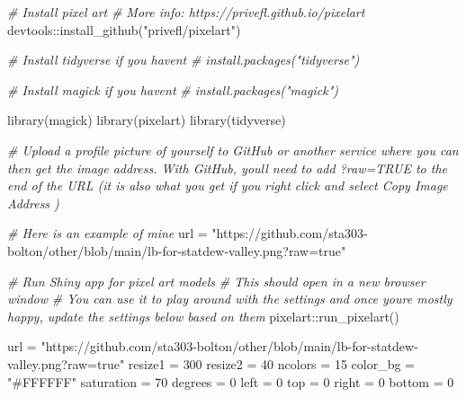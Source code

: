\documentclass[
  openany]{book}
\newenvironment{Shaded}{\begin{snugshade}}{\end{snugshade}}
\newcommand{\CommentTok}[1]{\textcolor[rgb]{0.56,0.35,0.01}{\textit{#1}}}
\newcommand{\DecValTok}[1]{\textcolor[rgb]{0.00,0.00,0.81}{#1}}
\newcommand{\FunctionTok}[1]{\textcolor[rgb]{0.00,0.00,0.00}{#1}}
\newcommand{\NormalTok}[1]{#1}
\newcommand{\OtherTok}[1]{\textcolor[rgb]{0.56,0.35,0.01}{#1}}
\newcommand{\SpecialCharTok}[1]{\textcolor[rgb]{0.00,0.00,0.00}{#1}}
\newcommand{\StringTok}[1]{\textcolor[rgb]{0.31,0.60,0.02}{#1}}
\begin{document}
\begin{Shaded}
\begin{Highlighting}[]
\CommentTok{\# Install pixel art}
\CommentTok{\# More info: https://privefl.github.io/pixelart}
\NormalTok{devtools}\SpecialCharTok{::}\FunctionTok{install\_github}\NormalTok{(}\StringTok{"privefl/pixelart"}\NormalTok{)}

\CommentTok{\# Install tidyverse if you haven\textquotesingle{}t}
\CommentTok{\# install.packages("tidyverse")}

\CommentTok{\# Install magick if you haven\textquotesingle{}t}
\CommentTok{\# install.packages("magick")}

\FunctionTok{library}\NormalTok{(magick)}
\FunctionTok{library}\NormalTok{(pixelart)}
\FunctionTok{library}\NormalTok{(tidyverse)}

\CommentTok{\# Upload a profile picture of yourself to GitHub or another service where you can then get the image address. With GitHub, you\textquotesingle{}ll need to add ?raw=TRUE to the end of the URL (it is also what you get if you right click and select \textquotesingle{}Copy Image Address\textquotesingle{} )}

\CommentTok{\# Here is an example of mine}
\NormalTok{url }\OtherTok{=} \StringTok{"https://github.com/sta303{-}bolton/other/blob/main/lb{-}for{-}statdew{-}valley.png?raw=true"}

\CommentTok{\# Run Shiny app for pixel art models}
\CommentTok{\# This should open in a new browser window}
\CommentTok{\# You can use it to play around with the settings and once you\textquotesingle{}re mostly happy, update the settings below based on them}
\NormalTok{pixelart}\SpecialCharTok{::}\FunctionTok{run\_pixelart}\NormalTok{()}

\NormalTok{url }\OtherTok{=} \StringTok{"https://github.com/sta303{-}bolton/other/blob/main/lb{-}for{-}statdew{-}valley.png?raw=true"}
\NormalTok{resize1 }\OtherTok{=} \DecValTok{300}
\NormalTok{resize2 }\OtherTok{=} \DecValTok{40}
\NormalTok{ncolors }\OtherTok{=} \DecValTok{15}
\NormalTok{color\_bg }\OtherTok{=} \StringTok{"\#FFFFFF"}
\NormalTok{saturation }\OtherTok{=} \DecValTok{70}
\NormalTok{degrees }\OtherTok{=} \DecValTok{0}
\NormalTok{left }\OtherTok{=} \DecValTok{0}
\NormalTok{top }\OtherTok{=} \DecValTok{0}
\NormalTok{right }\OtherTok{=} \DecValTok{0}
\NormalTok{bottom }\OtherTok{=} \DecValTok{0}



\end{Highlighting}
\end{Shaded}
\end{document}
